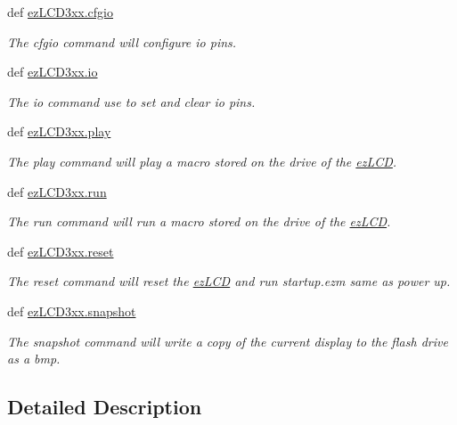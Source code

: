 \begin{DoxyCompactItemize}
def \hyperlink{group___general_ga38687b7d07bf93afe6891d3dca6205f4}{ez\-L\-C\-D3xx.\-cfgio}
\begin{DoxyCompactList}\small\item\em The cfgio command will configure io pins. \end{DoxyCompactList}\item 
def \hyperlink{group___general_gaf87ad0b88f8a279c20666363bc7460b6}{ez\-L\-C\-D3xx.\-io}
\begin{DoxyCompactList}\small\item\em The io command use to set and clear io pins. \end{DoxyCompactList}\item 
def \hyperlink{group___general_ga15f87f284189816d98ab5bf0b5a94a99}{ez\-L\-C\-D3xx.\-play}
\begin{DoxyCompactList}\small\item\em The play command will play a macro stored on the drive of the \hyperlink{classez_l_c_d3xx_1_1ez_l_c_d}{ez\-L\-C\-D}. \end{DoxyCompactList}\item 
def \hyperlink{group___general_ga7faa11f7fbe4da6ba981a5b8c4cb37aa}{ez\-L\-C\-D3xx.\-run}
\begin{DoxyCompactList}\small\item\em The run command will run a macro stored on the drive of the \hyperlink{classez_l_c_d3xx_1_1ez_l_c_d}{ez\-L\-C\-D}. \end{DoxyCompactList}\item 
def \hyperlink{group___general_gabc1cd3bb62dfa8a8f37f5da5cbb3e85c}{ez\-L\-C\-D3xx.\-reset}
\begin{DoxyCompactList}\small\item\em The reset command will reset the \hyperlink{classez_l_c_d3xx_1_1ez_l_c_d}{ez\-L\-C\-D} and run startup.\-ezm same as power up. \end{DoxyCompactList}\item 
def \hyperlink{group___general_ga8a1ef000b3c71704260c9e5f949e80de}{ez\-L\-C\-D3xx.\-snapshot}
\begin{DoxyCompactList}\small\item\em The snapshot command will write a copy of the current display to the flash drive as a bmp. \end{DoxyCompactList}\end{DoxyCompactItemize}


\subsection{Detailed Description}


